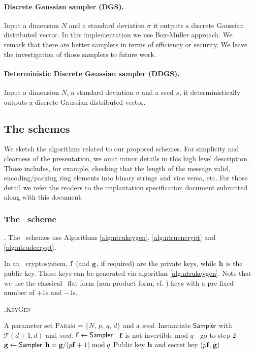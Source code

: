 \documentclass{llncs}
\newcommand{\bff}{{\bf f}}
\newcommand{\bfg}{{\bf g}}
\newcommand{\bfh}{{\bf h}}
\newcommand{\ntru}{{\sf{NTRU}}}
\newcommand{\ntrupke}{{\sf{ntru-pke}}}
\newcommand{\keygen}{{\textsc{KeyGen}}}
\newcommand{\<}{\langle}
\renewcommand{\>}{\rangle}
\newcommand{\LineIf}[2]{ \STATE \algorithmicif\ {#1}\ \algorithmicthen\ {#2} \algorithmicend\ \algorithmicif }
\begin{document}
\paragraph{Discrete Gaussian sampler (\textsf{DGS}).} Input a
dimension $N$ and a standard deviation $\sigma$ it outputs a discrete Gaussian distributed vector. In this implementation we use Box-Muller
approach. We remark that there are better samplers in terms of 
efficiency or security. We leave the investigation of those samplers
to future work.

\paragraph{Deterministic Discrete Gaussian sampler (\textsf{DDGS}).}Input a
dimension $N$, a standard deviation $\sigma$ and
a seed $s$, it deterministically outputs a discrete Gaussian distributed vector.


\subsection{The schemes}
We sketch the algorithms related to our proposed schemes. For simplicity
and clearness of the presentation, we omit minor details 
in this high level description. Those includes, for example, checking that
the length of the message valid, encoding/packing ring elements into binary strings and vice versa, etc.
For those detail we refer the readers to the implantation specification
document submitted along with this document.

\subsubsection{The \ntrupke~scheme}. The \ntrupke~schemes use Algorithms
\ref{alg:ntrukeygen}, \ref{alg:ntruencrypt} and \ref{alg:ntrudecrypt}.

In an \ntru~cryptosystem, $\bff$ (and $\bfg$, if
required) are 
the private keys, while $\bfh$ is the public key.
Those keys can be generated via algorithm
\ref{alg:ntrukeygen}.
Note that we use the classical \ntru~flat form (non-product form, cf. \cite{DBLP:conf/ctrsa/HoffsteinPSSWZ17}) keys 
with a pre-fixed number of $+1$s and $-1$s.

\begin{algorithm}
\caption{{\ntrupke}.\keygen}
\begin{algorithmic}[1]\label{alg:ntrukeygen}
\REQUIRE A parameter set \textsc{Param} = $\{N$, $p$, $q$, $d\}$ and a {\em seed}.
\STATE Instantiate $\textsf{Sampler}$ with $\mathcal{T}(d+1,d)$ and {\em seed};
\STATE $\bff \gets \textsf{Sampler}$  
\LineIf {$\bff$ is not invertible mod $q$} {go to step 2}
\STATE $\bfg \gets \textsf{Sampler}$
\STATE $\bfh = \bfg/(p\bff+1) \bmod q$
\ENSURE Public key $\bfh$ and secret key $(p\bff,\bfg)$

\end{algorithmic}
\end{algorithm}
\end{document}
